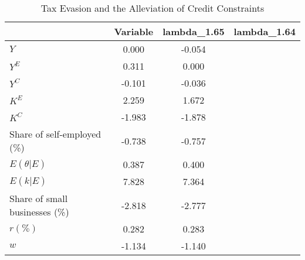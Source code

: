 \begin{sidewaystable}[htbp] \centering 
\caption{Tax Evasion and the Alleviation of Credit Constraints} 
\label{table: alevcreditconstr} 
\begin{tabular}{l c c } \hline 
& Variable & lambda_1.65  & lambda_1.64  \\ 
\hline \hline 
$Y$        &    0.000 &   -0.054  \\ 
$Y^{E}$    &    0.311 &    0.000  \\ 
$Y^{C}$    &   -0.101 &   -0.036  \\ 
$K^{E}$    &    2.259 &    1.672  \\ 
$K^{C}$    &   -1.983 &   -1.878  \\ 
Share of self-employed (\%)&   -0.738 &   -0.757  \\ 
$E(\theta|E)$ &    0.387 &    0.400 \\ 
$E(k|E)$       &    7.828 &    7.364 \\ 
Share of small businesses (\%)&   -2.818 &   -2.777  \\ 
$r(\%)$          &    0.282 &    0.283  \\ 
$w$                &   -1.134 &   -1.140  \\ 
\hline  
 \end{tabular} 
\end{sidewaystable} 
